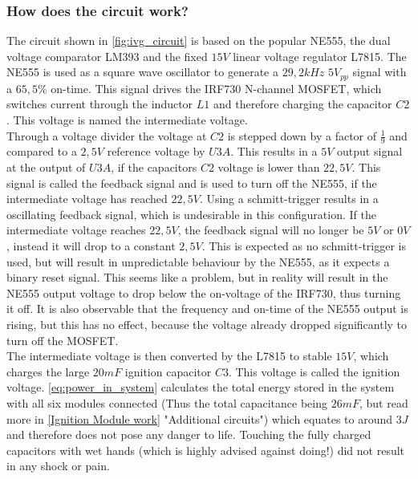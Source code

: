 \pagebreak

\subsubsection{How does the circuit work?}

\noindent The circuit shown in \cref{fig:ivg_circuit} is based on the popular NE555, the dual voltage comparator LM393 and the fixed $15V$ linear voltage regulator L7815. The NE555 is used as a square wave oscillator to generate a $29,2kHz$ $5V_{pp}$ signal with a $65,5\%$ on-time. This signal drives the IRF730 N-channel MOSFET, which switches current through the inductor $L1$ and therefore charging the capacitor $C2$. This voltage is named the intermediate voltage.\\

\noindent Through a voltage divider the voltage at $C2$ is stepped down by a factor of $\frac{1}{9}$ and compared to a $2,5V$ reference voltage by $U3A$. This results in a $5V$ output signal at the output of $U3A$, if the capacitors $C2$ voltage is lower than $22,5V$. This signal is called the feedback signal and is used to turn off the NE555, if the intermediate voltage has reached $22,5V$. Using a schmitt-trigger results in a oscillating feedback signal, which is undesirable in this configuration. If the intermediate voltage reaches $22,5V$, the feedback signal will no longer be $5V$ or $0V$, instead it will drop to a constant $2,5V$. This is expected as no schmitt-trigger is used, but will result in unpredictable behaviour by the NE555, as it expects a binary reset signal. This seems like a problem, but in reality will result in the NE555 output voltage to drop below the on-voltage of the IRF730, thus turning it off. It is also observable that the frequency and on-time of the NE555 output is rising, but this has no effect, because the voltage already dropped significantly to turn off the MOSFET. \\

\noindent The intermediate voltage is then converted by the L7815 to stable $15V$, which charges the large $20mF$ ignition capacitor $C3$. This voltage is called the ignition voltage. \cref{eq:power_in_system} calculates the total energy stored in the system with all six modules connected (Thus the total capacitance being $26mF$, but read more in \cref{Ignition Module work} "Additional circuits") which equates to around $3J$ and therefore does not pose any  danger to life. Touching the fully charged capacitors with wet hands (which is highly advised against doing!) did not result in any shock or pain.\\

